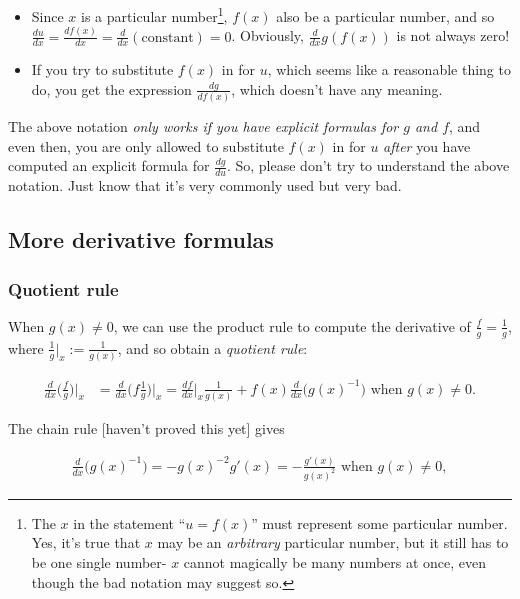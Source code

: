 \documentclass{article}
\begin{document}
\begin{itemize}
    \item Since $x$ is a particular number\footnote{The $x$ in the statement ``$u = f(x)$'' must represent some particular number. Yes, it's true that $x$ may be an \textit{arbitrary} particular number, but it still has to be one single number- $x$ cannot magically be many numbers at once, even though the bad notation may suggest so.}, $f(x)$ also be a particular number, and so $\frac{du}{dx} = \frac{df(x)}{dx} = \frac{d}{dx}(\text{constant}) = 0$. Obviously, $\frac{d}{dx}g(f(x))$ is not always zero! 
    \item If you try to substitute $f(x)$ in for $u$, which seems like a reasonable thing to do, you get the expression $\frac{dg}{df(x)}$, which doesn't have any meaning.
\end{itemize}

The above notation \textit{only works if you have explicit formulas for $g$ and $f$}, and even then, you are only allowed to substitute $f(x)$ in for $u$ \textit{after} you have computed an explicit formula for $\frac{dg}{du}$. So, please don't try to understand the above notation. Just know that it's very commonly used but very bad.

\subsection*{More derivative formulas}

\subsubsection*{Quotient rule}

When $g(x) \neq 0$, we can use the product rule to compute the derivative of $\frac{f}{g} =  \frac{1}{g}$, where $\frac{1}{g}\Big|_x := \frac{1}{g(x)}$, and so obtain a \textit{quotient rule}:

\begin{align*}
    \frac{d}{dx}\Big(\frac{f}{g}\Big)\Big|_x
    &= \frac{d}{dx}\Big(f \frac{1}{g} \Big)\Big|_x  = \frac{df}{dx}\Big|_x \frac{1}{g(x)} + f(x) \frac{d}{dx}\Big(g(x)^{-1} \Big) \text{ when $g(x) \neq 0$}.
\end{align*}

The chain rule [haven't proved this yet] gives

\begin{align*}
    \frac{d}{dx}\Big(g(x)^{-1} \Big) = -g(x)^{-2}g'(x) = -\frac{g'(x)}{g(x)^2} \text{ when $g(x) \neq 0$},
\end{align*}
\end{document}
